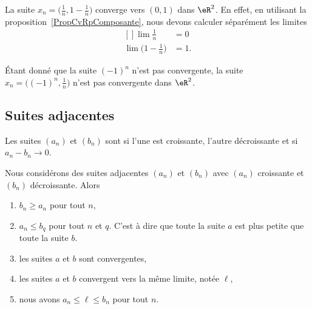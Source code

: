 \begin{example}
	La suite $x_n=\big( \frac{1}{ n },1-\frac{1}{ n } \big)$ converge vers $(0,1)$ dans $\eR^2$. En effet, en utilisant la proposition~\ref{PropCvRpComposante}, nous devons calculer séparément les limites
	\begin{equation}
		\begin{aligned}[]
			\lim\frac{1}{ n }&=0\\
			\lim\big( 1-\frac{1}{ n } \big)&=1.
		\end{aligned}
	\end{equation}
\end{example}

\begin{example}
	Étant donné que la suite $(-1)^n$ n'est pas convergente, la suite $x_n=\big( (-1)^n,\frac{1}{ n } \big)$ n'est pas convergente dans $\eR^2$.
\end{example}

\subsection{Suites adjacentes}

\begin{definition}       \label{DEFooDMZLooDtNPmu}
    Les suites \( (a_n)\) et \( (b_n)\) sont  si l'une est croissante, l'autre décroissante et si \( a_n-b_n\to 0\).
\end{definition}

\begin{theorem}      \label{THOooZJWLooAtGMxD}
    Nous considérons des suites adjacentes \( (a_n)\) et \( (b_n)\) avec \( (a_n)\) croissante et \( (b_n)\) décroissante. Alors
    \begin{enumerate}
        \item
            \( b_n\geq a_n\) pour tout \( n\),
        \item
            \( a_n\leq b_q\) pour tout \( n\) et \( q\). C'est à dire que toute la suite \( a\) est plus petite que toute la suite \( b\).
        \item
            les suites \( a\) et \( b\) sont convergentes,
        \item
            les suites \( a\) et \( b\) convergent vers la même limite, notée \( \ell\),
        \item
            nous avons \( a_n\leq \ell\leq b_n\) pour tout \( n\).
    \end{enumerate}
\end{theorem}

